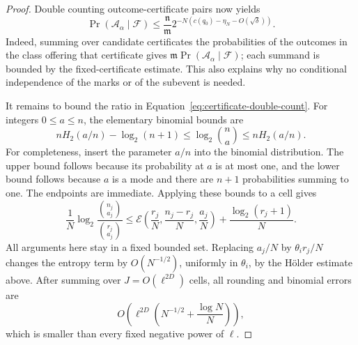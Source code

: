 \begin{proof}
Double counting outcome-certificate pairs now yields
\begin{equation}\label{eq:certificate-double-count}
 \Pr(\mathcal A_\alpha\mid\mathcal F)
 \le \frac{\mathfrak n}{\mathfrak m}
       2^{-N(c(q_0)-\eta_N-O(\sqrt\delta))}.
\end{equation}
Indeed, summing over candidate certificates the probabilities of the
outcomes in the class offering that certificate gives
\(\mathfrak m\Pr(\mathcal A_\alpha\mid\mathcal F)\); each summand
is bounded by the fixed-certificate estimate. This also explains why
no conditional independence of the marks or of the subevent is needed.

It remains to bound the ratio in Equation~\eqref{eq:certificate-double-count}.
For integers \(0\le a\le n\), the elementary binomial bounds are
\[
 nH_2(a/n)-\log_2(n+1)
 \le\log_2\binom na\le nH_2(a/n).
\]
For completeness, insert the parameter \(a/n\) into the binomial
distribution. The upper bound follows because its probability at \(a\)
is at most one, and the lower bound follows because \(a\) is a mode and
there are \(n+1\) probabilities summing to one. The endpoints are
immediate. Applying these bounds to a cell gives
\[
 \frac1N\log_2\frac{\binom{n_j}{a_j}}{\binom{r_j}{a_j}}
 \le
 \mathcal E\!\left(\frac{r_j}{N},\frac{n_j-r_j}{N},\frac{a_j}{N}\right)
       +\frac{\log_2(r_j+1)}N.
\]
All arguments here stay in a fixed bounded set. Replacing \(a_j/N\)
by \(\theta_i r_j/N\) changes the entropy term by \(O(N^{-1/2})\),
uniformly in \(\theta_i\), by the H\"older estimate above. After summing
over \(J=O(\ell^{2D})\) cells, all rounding and binomial errors are
\[
 O\!\left(\ell^{2D}\left(N^{-1/2}+\frac{\log N}{N}\right)\right),
\]
which is smaller than every fixed negative power of \(\ell\).


\end{proof}
